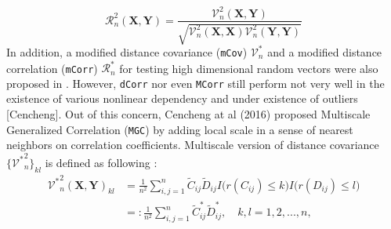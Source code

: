 \documentclass[12pt]{article}
\theoremstyle{definition}
\begin{document}
\begin{equation}	 
\mathcal{R}_{n}^{2} (\mathbf{X}, \mathbf{Y}) = \frac{\mathcal{V}^2_{n} (\mathbf{X}, \mathbf{Y}) }{\sqrt{\mathcal{V}^2_{n} (\mathbf{X}, \mathbf{X}) \mathcal{V}^2_{n} (\mathbf{Y}, \mathbf{Y}) } }
\end{equation}
In addition, a modified distance covariance (\texttt{mCov}) $\mathcal{V}^*_{n}$ and a modified distance correlation (\texttt{mCorr}) $\mathcal{R}^{*}_{n}$ for testing high dimensional random vectors were also proposed in \cite{szekely2013distance}.   
However, \texttt{dCorr} nor even \texttt{MCorr} still perform not very well in the existence of various nonlinear dependency and under existence of outliers [Cencheng]. Out of this concern, Cencheng at al (2016) proposed Multiscale Generalized Correlation (\texttt{MGC}) by adding local scale in a sense of nearest neighbors on correlation coefficients. Multiscale version of distance covariance $\{ { {\mathcal{V}^{*}}^2_{n} }   \}_{kl}$ is defined as following : 
\begin{equation}
\label{eq:MGC}
\begin{split}
{\mathcal{V}^{*}}^2_{n} (\mathbf{X}, \mathbf{Y})_{kl}  & = \frac{1}{n^2} \sum\limits_{i,j=1}^{n} \tilde{C}_{ij} \tilde{D}_{ij} I \big( r(C_{ij}) \leq k \big) I \big( r(D_{ij}) \leq l  \big) \\  
& = : \frac{1}{n^2} \sum\limits_{i,j=1}^{n} \tilde{C}^{*}_{ij} \tilde{D}^{*}_{ij},
\quad k,l=1,2,..., n ,
\end{split}
\end{equation}
\end{document}
